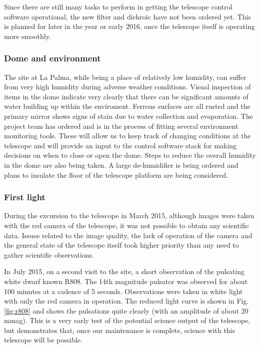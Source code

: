 \documentclass[a4paper,fleqn,usenatbib]{mnras}
\begin{document}
Since there are still many tasks to perform in getting the telescope control software operational, the new filter and dichroic have not been ordered yet. This is planned for later in the year or early 2016, once the telescope itself is operating more smoothly.

\subsubsection{Dome and environment}
The site at La Palma, while being a place of relatively low humidity, can suffer from very high humidity during adverse weather conditions. Visual inspection of items in the dome indicate very clearly that there can be significant amounts of water building up within the enviroment. Ferrous surfaces are all rusted and the primary mirror shows signs of stain due to water collection and evaporation. The project team has ordered and is in the process of fitting several environment monitoring tools. These will allow us to keep track of changing conditions at the telescope and will provide an input to the control software stack for making decisions on when to close or open the dome. Steps to reduce the overall humidity in the dome are also being taken. A large de-humidifier is being ordered and plans to insulate the floor of the telescope platform are being considered.  

\subsubsection{First light}
During the excursion to the telescope in March 2015, although images were taken with the red camera of the telescope, it was not possible to obtain any scientific data. Issues related to the image quality, the lack of operation of the camera and the general state of the telescope itself took higher priority than any need to gather scientific observations. 

In July 2015, on a second visit to the site, a short observation of the pulsating white dwarf known R808. The 14th magnitude pulsator was observed for about 100 minutes at a cadence of 5 seconds. Observations were taken in white light with only the red camera in operation.  The reduced light curve is shown in Fig. \ref{fig:r808} and shows the pulsations quite clearly (with an amplitude of about 20 mmag). This is a very early test of the potential science output of the telescope, but demonstrates that, once our maintenance is complete, science with this telescope will be possible.
\end{document}
